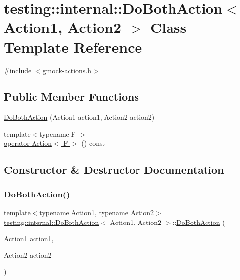 \hypertarget{classtesting_1_1internal_1_1_do_both_action}{}\section{testing\+:\+:internal\+:\+:Do\+Both\+Action$<$ Action1, Action2 $>$ Class Template Reference}
\label{classtesting_1_1internal_1_1_do_both_action}


{\ttfamily \#include $<$gmock-\/actions.\+h$>$}

\subsection*{Public Member Functions}
\begin{DoxyCompactItemize}
\item 
\hyperlink{classtesting_1_1internal_1_1_do_both_action_a55727c4dbdc1816ba6f1fe124e96088b}{Do\+Both\+Action} (Action1 action1, Action2 action2)
\item 
{\footnotesize template$<$typename F $>$ }\\\hyperlink{classtesting_1_1internal_1_1_do_both_action_a35733e2f117daad110bfbd3de84634a6}{operator Action$<$ F $>$} () const
\end{DoxyCompactItemize}


\subsection{Constructor \& Destructor Documentation}
\mbox{\label{classtesting_1_1internal_1_1_do_both_action_a55727c4dbdc1816ba6f1fe124e96088b}} 
\subsubsection{\texorpdfstring{Do\+Both\+Action()}{DoBothAction()}}
{\footnotesize\ttfamily template$<$typename Action1, typename Action2$>$ \\
\hyperlink{classtesting_1_1internal_1_1_do_both_action}{testing\+::internal\+::\+Do\+Both\+Action}$<$ Action1, Action2 $>$\+::\hyperlink{classtesting_1_1internal_1_1_do_both_action}{Do\+Both\+Action} (\begin{DoxyParamCaption}\item[{Action1}]{action1,  }\item[{Action2}]{action2 }\end{DoxyParamCaption})\hspace{0.3cm}{\ttfamily [inline]}}



